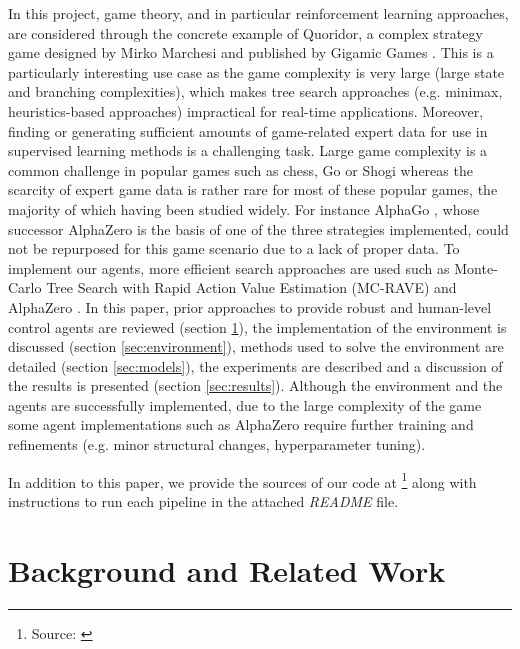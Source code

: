 \documentclass[journal, a4paper]{IEEEtran}
\begin{document}
In this project, game theory, and in particular reinforcement learning approaches, are considered through the concrete example of Quoridor, a complex strategy game designed by Mirko Marchesi and published by Gigamic Games \cite{quoridor-gigamic}. This is a particularly interesting use case as the game complexity is very large (large state and branching complexities), which makes tree search approaches (e.g. minimax, heuristics-based approaches) impractical for real-time applications. Moreover, finding or generating sufficient amounts of game-related expert data for use in supervised learning methods is a challenging task. Large game complexity is a common challenge in popular games such as chess, Go or Shogi whereas the scarcity of expert game data is rather rare for most of these popular games, the majority of which having been studied widely. For instance AlphaGo \cite{alphago}, whose successor AlphaZero \cite{alphazero} is the basis of one of the three strategies implemented, could not be repurposed for this game scenario due to a lack of proper data. To implement our agents, more efficient search approaches are used such as Monte-Carlo Tree Search with Rapid Action Value Estimation (MC-RAVE) \cite{MCTS-RAVE} and AlphaZero \cite{alphazero}. In this paper, prior approaches to provide robust and human-level control agents are reviewed (section \ref{sec:background}), the implementation of the environment is discussed (section \ref{sec:environment}), methods used to solve the environment are detailed (section \ref{sec:models}), the experiments are described and a discussion of the results is presented (section \ref{sec:results}).
 Although the environment and the agents are successfully implemented, due to the large complexity of the game some agent implementations such as AlphaZero require further training and refinements (e.g. minor structural changes, hyperparameter tuning). 

In addition to this paper, we provide the sources of our code at \footnote{Source: \url{}} along with instructions to run each pipeline in the attached \textit{README} file. 

\section{Background and Related Work}
\label{sec:background}
\end{document}
